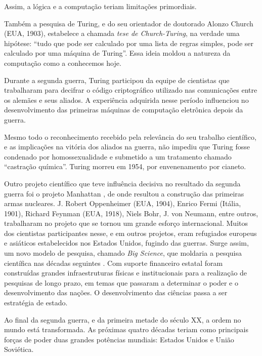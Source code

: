 \documentclass{hipatia}
\begin{document}
Assim, a lógica e a computação teriam limitações primordiais. 

Também a pesquisa de Turing, e do seu orientador de doutorado Alonzo Church (EUA, 1903), estabelece a chamada \textit{tese de Church-Turing}, na verdade uma hipótese:  ``tudo que pode ser calculado por uma lista de regras simples, pode ser calculado por uma máquina de Turing''. Essa ideia moldou a natureza da computação como a conhecemos hoje.

Durante a segunda guerra, Turing participou da equipe de cientistas que trabalharam para decifrar o código criptográfico utilizado nas comunicações entre os alemães e seus aliados. A experiência adquirida nesse período influenciou no desenvolvimento das primeiras máquinas de computação eletrônica depois da guerra.  

Mesmo todo o reconhecimento recebido pela relevância do seu trabalho científico, e as implicações na vitória dos aliados na guerra, não impediu que Turing fosse condenado por homossexualidade e submetido a um tratamento chamado ``castração química''. Turing morreu em 1954, por envenenamento por cianeto.

Outro projeto científico que teve influência decisiva no resultado da segunda guerra foi o projeto Manhattan \cite{Hodges2014}, de onde resultou a construção das primeiras armas nucleares. J. Robert Oppenheimer (EUA, 1904), Enrico Fermi (Itália, 1901), Richard Feynman (EUA, 1918), Niels Bohr, J. von Neumann, entre outros, trabalharam no projeto que se tornou um grande esforço internacional. Muitos dos cientistas participantes nesse, e em outros projetos, eram refugiados europeus e asiáticos estabelecidos nos Estados Unidos, fugindo das guerras. Surge assim, um novo modelo de pesquisa, chamado \textit{Big Science}, que moldaria a pesquisa científica nas décadas seguintes \cite{Galison1992}. Com suporte financeiro estatal foram construídas grandes infraestruturas físicas e institucionais para a realização de pesquisas de longo prazo, em temas que passaram a determinar o poder e o desenvolvimento das nações. O desenvolvimento das ciências passa a ser estratégia de estado.

Ao final da segunda guerra, e da primeira metade do século XX, a ordem no mundo está transformada. As próximas quatro décadas teriam como principais forças de poder duas grandes potências mundiais: Estados Unidos e União Soviética.
\end{document}
